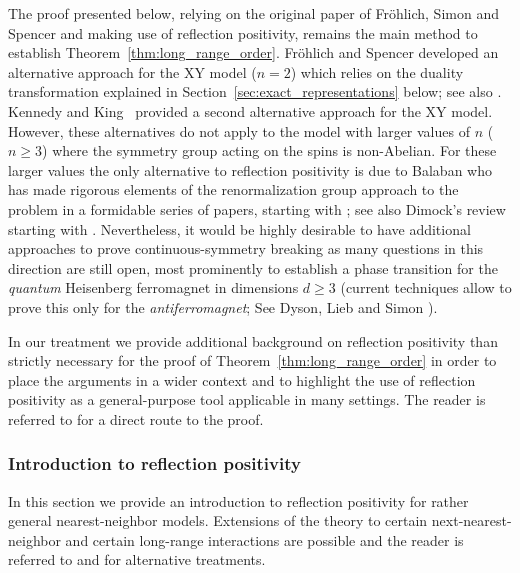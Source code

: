 \documentclass[12pt,reqno]{article}
\begin{document}
The proof presented below, relying on the original paper of Fr\"ohlich, Simon and Spencer \cite{FroSimSpe76} and making use of reflection positivity, remains the main method to establish Theorem~\ref{thm:long_range_order}. Fr\"ohlich and Spencer \cite{frohlich1982massless} developed an alternative approach for the XY model ($n=2$) which relies on the duality transformation explained in Section~\ref{sec:exact_representations} below; see also \cite[Section 5.5]{Bauerschmidt2016}. Kennedy and King~\cite{kennedy1986spontaneous} provided a second alternative approach for the XY model.
However, these alternatives do not apply to the model with larger values of $n$ ($n\ge 3$) where the symmetry group acting on the spins is non-Abelian. For these larger values the only alternative to reflection positivity is due to Balaban who has made rigorous elements of the renormalization group approach to the problem in a formidable series of papers, starting with \cite{balaban1995low}; see also Dimock's review starting with \cite{dimock2013renormalization}. Nevertheless, it would be highly desirable to have additional approaches to prove continuous-symmetry breaking as many questions in this direction are still open, most prominently to establish a phase transition for the \emph{quantum} Heisenberg ferromagnet in dimensions $d\ge3$ (current techniques allow to prove this only for the \emph{antiferromagnet}; See Dyson, Lieb and Simon \cite{dyson1978phase}).

In our treatment we provide additional background on reflection positivity than strictly necessary for the proof of Theorem~\ref{thm:long_range_order} in order to place the arguments in a wider context and to highlight the use of reflection positivity as a general-purpose tool applicable in many settings. The reader is referred to \cite[Lecture 2, part 2]{Ueltschi2013} for a direct route to the proof.

\subsubsection{Introduction to reflection positivity}\label{sec:introduction_to_reflection_positivity}
In this section we provide an introduction to reflection positivity for rather general nearest-neighbor models. Extensions of the theory to certain next-nearest-neighbor and certain long-range interactions are possible and the reader is referred to \cite{frohlich1978phase, frohlich1980phase, biskup2009reflection} and \cite[Chapter 10]{friedli2016statistical} for alternative treatments.
\end{document}
